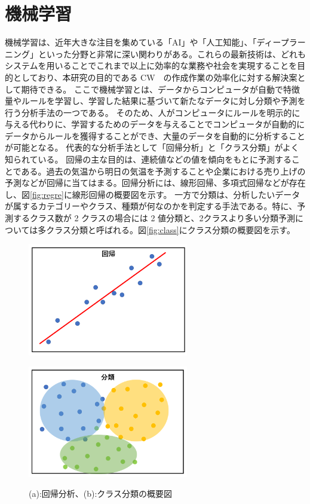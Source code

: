 \section{機械学習}
機械学習は、近年大きな注目を集めている「AI」や「人工知能」、「ディープラーニング」といった分野と非常に深い関わりがある。これらの最新技術は、どれもシステムを用いることでこれまで以上に効率的な業務や社会を実現することを目的としており、本研究の目的である CW　の作成作業の効率化に対する解決案として期待できる。
ここで機械学習とは、データからコンピュータが自動で特徴量やルールを学習し、学習した結果に基づいて新たなデータに対し分類や予測を行う分析手法の一つである。
そのため、人がコンピュータにルールを明示的に与える代わりに、学習するためのデータを与えることでコンピュータが自動的にデータからルールを獲得することができ、大量のデータを自動的に分析することが可能となる。
代表的な分析手法として「回帰分析」と「クラス分類」がよく知られている。
回帰の主な目的は、連続値などの値を傾向をもとに予測することである。過去の気温から明日の気温を予測することや企業における売り上げの予測などが回帰に当てはまる。回帰分析には、線形回帰、多項式回帰などが存在し、図\ref{fig:regre}に線形回帰の概要図を示す。
一方で分類は、分析したいデータが属するカテゴリーやクラス、種類が何なのかを判定する手法である。特に、予測するクラス数が 2 クラスの場合には 2 値分類と、2クラスより多い分類予測については多クラス分類と呼ばれる。図\ref{fig:class}にクラス分類の概要図を示す。
\begin{figure}[tb]
  \centering
    \begin{minipage}[b]{0.4\linewidth}
        \centering
        \includegraphics[clip, width=7cm]{fig/4/regression.png}
        \vspace{10pt}
        \subcaption{}
        \label{fig:regre}
    \end{minipage}
    \hfill
    \begin{minipage}[b]{0.4\linewidth}
        \centering
        \includegraphics[clip, width=7cm]{fig/4/classification.png}
        \vspace{10pt}
        \subcaption{}
        \label{fig:class}
    \end{minipage}
  \caption{(a):回帰分析、(b):クラス分類の概要図}
  \label{fig:fit_def}
\end{figure}

